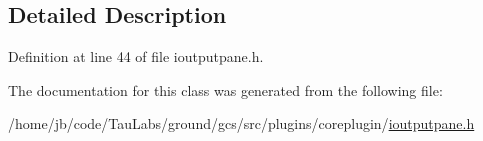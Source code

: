 \subsection{\-Detailed \-Description}


\-Definition at line 44 of file ioutputpane.\-h.



\-The documentation for this class was generated from the following file\-:\begin{DoxyCompactItemize}
\item 
/home/jb/code/\-Tau\-Labs/ground/gcs/src/plugins/coreplugin/\hyperlink{ioutputpane_8h}{ioutputpane.\-h}\end{DoxyCompactItemize}
